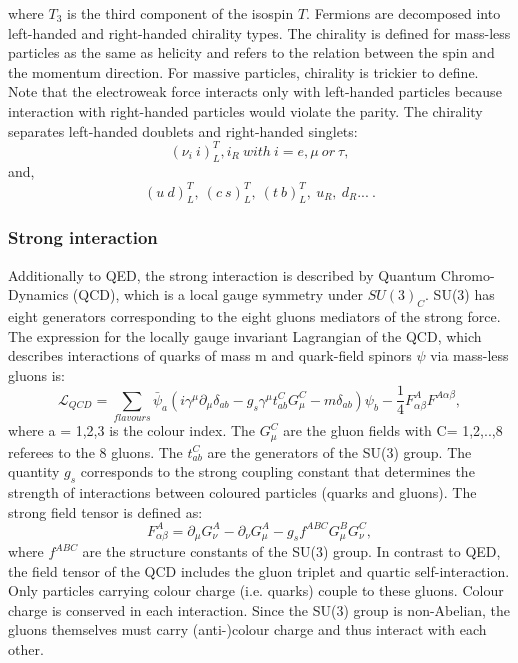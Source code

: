 where $T_3$ is the third component of the isospin $T$.
Fermions are decomposed into left-handed and right-handed chirality types. The chirality is defined for mass-less particles as the same as helicity and refers to the relation between the spin and the momentum direction. For massive particles, chirality is trickier to define. Note that the electroweak force interacts only with left-handed particles because interaction with right-handed particles would violate the parity. The chirality separates left-handed doublets and right-handed singlets:
\begin{equation}
    (\nu_i \ i)^T_L, i_R \ with \ i = e, \mu \ or \ \tau,
\end{equation}
and, 
\begin{equation}
    (u \ d)^T_L, \ (c \ s)^T_L, \ (t \ b)^T_L, \ u_R, \ d_R ... \ . 
\end{equation}

\subsubsection{Strong interaction}
Additionally to QED, the strong interaction is described by Quantum Chromo-Dynamics (QCD), which is a local gauge symmetry under $SU(3)_C$. SU(3) has eight generators corresponding to the eight gluons mediators of the strong force. The expression for the locally gauge invariant Lagrangian of the QCD, which describes interactions of quarks of mass m and quark-field spinors $\psi$ via mass-less gluons is:
\begin{equation}
    \mathcal{L}_{QCD} = \sum_{flavours} \bar{\psi}_a(i\gamma^\mu\partial_\mu\delta_{ab}-g_{s}\gamma^\mu t^C_{ab}G^C_\mu - m\delta_{ab})\psi_b - \frac{1}{4}F^A_{\alpha\beta}F^{A\alpha\beta},
\end{equation}
where a = 1,2,3 is the colour index. The $G^{C}_\mu$ are the gluon fields with C= 1,2,..,8 referees to the 8 gluons. The $t^C_{ab}$ are the generators of the SU(3) group. The quantity $g_{s}$ corresponds to the strong coupling constant that determines the strength of interactions between coloured particles (quarks and gluons). The strong field tensor is defined as:
\begin{equation}
    F^A_{\alpha\beta} = \partial_\mu G^A_\nu - \partial_\nu G^A_\mu - g_sf^{ABC}G^B_\mu G^C_\nu,
\end{equation}
where $f^{ABC}$ are the structure constants of the SU(3) group. In contrast to QED, the field tensor of the QCD includes the gluon triplet and quartic self-interaction. Only particles carrying colour charge (i.e. quarks) couple to these gluons. Colour charge is conserved in each interaction. Since the SU(3) group is non-Abelian, the gluons themselves must carry (anti-)colour charge and thus interact with each other. \\

